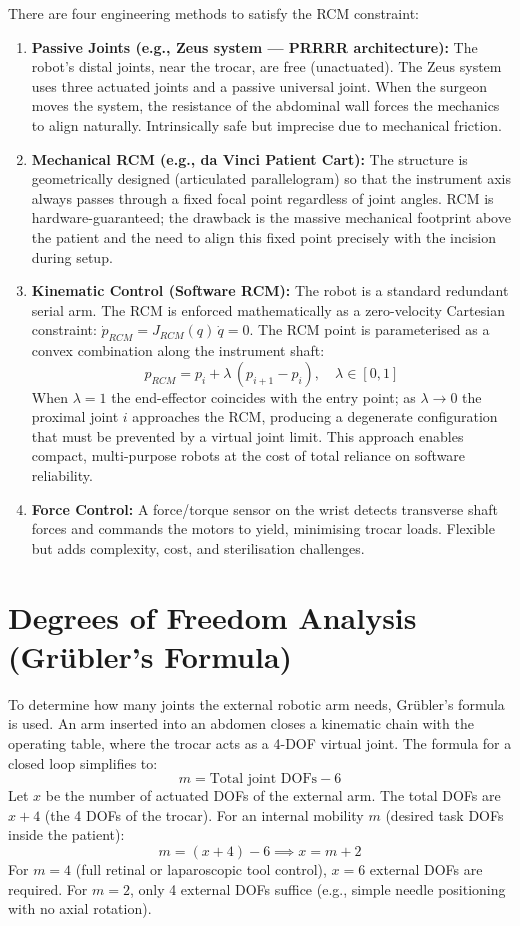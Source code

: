\documentclass[11pt,a4paper,twoside]{report}
\begin{document}
There are four engineering methods to satisfy the RCM constraint:
\begin{enumerate}
    \item \textbf{Passive Joints (e.g., Zeus system — PRRRR architecture):} The robot's distal joints, near the trocar, are free (unactuated). The Zeus system uses three actuated joints and a passive universal joint. When the surgeon moves the system, the resistance of the abdominal wall forces the mechanics to align naturally. Intrinsically safe but imprecise due to mechanical friction.
    \item \textbf{Mechanical RCM (e.g., da Vinci Patient Cart):} The structure is geometrically designed (articulated parallelogram) so that the instrument axis always passes through a fixed focal point regardless of joint angles. RCM is hardware-guaranteed; the drawback is the massive mechanical footprint above the patient and the need to align this fixed point precisely with the incision during setup.
    \item \textbf{Kinematic Control (Software RCM):} The robot is a standard redundant serial arm. The RCM is enforced mathematically as a zero-velocity Cartesian constraint: $\dot{p}_{RCM} = J_{RCM}(q)\,\dot{q} = 0$. The RCM point is parameterised as a convex combination along the instrument shaft:
    \[
        p_{RCM} = p_i + \lambda\,(p_{i+1} - p_i), \quad \lambda \in [0,1]
    \]
    When $\lambda = 1$ the end-effector coincides with the entry point; as $\lambda \to 0$ the proximal joint $i$ approaches the RCM, producing a degenerate configuration that must be prevented by a virtual joint limit. This approach enables compact, multi-purpose robots at the cost of total reliance on software reliability.
    \item \textbf{Force Control:} A force/torque sensor on the wrist detects transverse shaft forces and commands the motors to yield, minimising trocar loads. Flexible but adds complexity, cost, and sterilisation challenges.
\end{enumerate}

\section{Degrees of Freedom Analysis (Grübler's Formula)}
To determine how many joints the external robotic arm needs, Grübler's formula is used. An arm inserted into an abdomen closes a kinematic chain with the operating table, where the trocar acts as a 4-DOF virtual joint.
The formula for a closed loop simplifies to:
\begin{equation}
    m = \text{Total joint DOFs} - 6
\end{equation}
Let $x$ be the number of actuated DOFs of the external arm. The total DOFs are $x + 4$ (the 4 DOFs of the trocar). For an internal mobility $m$ (desired task DOFs inside the patient):
\[
    m = (x + 4) - 6 \implies x = m + 2
\]
For $m = 4$ (full retinal or laparoscopic tool control), $x = 6$ external DOFs are required. For $m = 2$, only 4 external DOFs suffice (e.g., simple needle positioning with no axial rotation).
\end{document}
